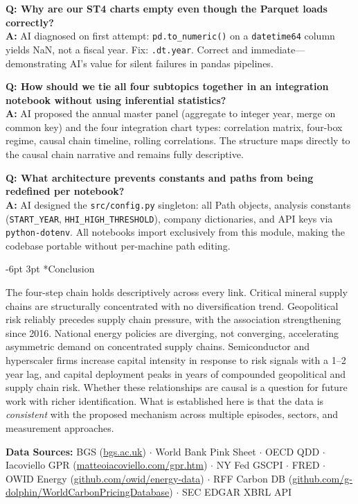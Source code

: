 \documentclass[10pt,twocolumn,letterpaper]{article}
\makeatletter
\renewcommand\section{\@startsection{section}{1}{\z@}%
  {-6pt \@plus -2pt \@minus -1pt}{3pt \@plus 1pt}%
  {\normalfont\normalsize\bfseries\color{accent}}}
\makeatother
\begin{document}
\textbf{Q: Why are our ST4 charts empty even though the Parquet loads correctly?}\\
\textbf{A:} AI diagnosed on first attempt: \texttt{pd.to\_numeric()} on a \texttt{datetime64}
column yields NaN, not a fiscal year. Fix: \texttt{.dt.year}. Correct and immediate---
demonstrating AI's value for silent failures in pandas pipelines.

\textbf{Q: How should we tie all four subtopics together in an integration notebook without
using inferential statistics?}\\
\textbf{A:} AI proposed the annual master panel (aggregate to integer year, merge on common key)
and the four integration chart types: correlation matrix, four-box regime, causal chain timeline,
rolling correlations. The structure maps directly to the causal chain narrative and remains
fully descriptive.

\textbf{Q: What architecture prevents constants and paths from being redefined per notebook?}\\
\textbf{A:} AI designed the \texttt{src/config.py} singleton: all Path objects, analysis
constants (\texttt{START\_YEAR}, \texttt{HHI\_HIGH\_THRESHOLD}), company dictionaries, and API
keys via \texttt{python-dotenv}. All notebooks import exclusively from this module, making the
codebase portable without per-machine path editing.

\section*{Conclusion}

The four-step chain holds descriptively across every link. Critical mineral supply chains are
structurally concentrated with no diversification trend. Geopolitical risk reliably precedes
supply chain pressure, with the association strengthening since 2016. National energy policies
are diverging, not converging, accelerating asymmetric demand on concentrated supply chains.
Semiconductor and hyperscaler firms increase capital intensity in response to risk signals with
a 1--2 year lag, and capital deployment peaks in years of compounded geopolitical and supply
chain risk. Whether these relationships are causal is a question for future work with richer
identification. What is established here is that the data is \textit{consistent} with the
proposed mechanism across multiple episodes, sectors, and measurement approaches.

\vspace{4pt}
{\footnotesize\noindent\textbf{Data Sources:}
BGS (\url{bgs.ac.uk}) $\cdot$
World Bank Pink Sheet $\cdot$
OECD QDD $\cdot$
Iacoviello GPR (\url{matteoiacoviello.com/gpr.htm}) $\cdot$
NY Fed GSCPI $\cdot$
FRED $\cdot$
OWID Energy (\url{github.com/owid/energy-data}) $\cdot$
RFF Carbon DB (\url{github.com/g-dolphin/WorldCarbonPricingDatabase}) $\cdot$
SEC EDGAR XBRL API
}
\end{document}
